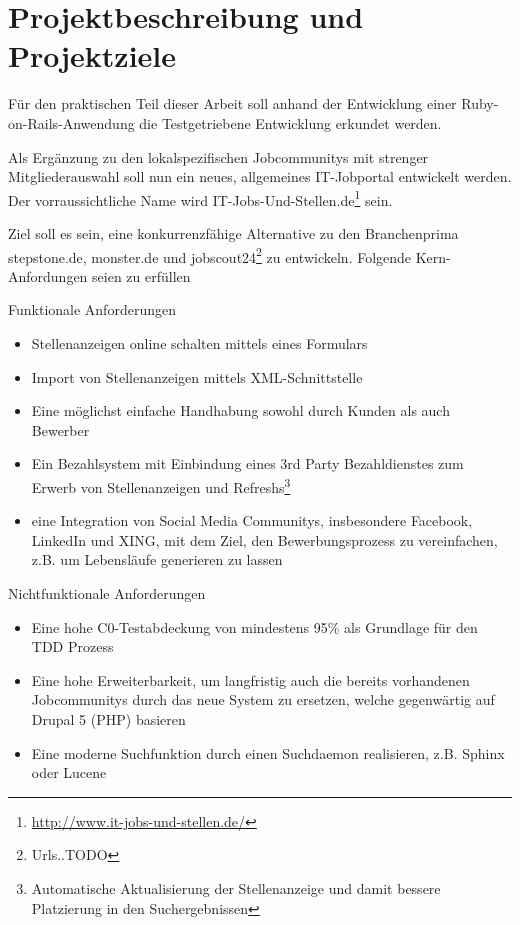 
\section{Projektbeschreibung und Projektziele}
Für den praktischen Teil dieser Arbeit soll anhand der Entwicklung einer Ruby-on-Rails-Anwendung die Testgetriebene Entwicklung erkundet werden.

Als Ergänzung zu den lokalspezifischen Jobcommunitys mit strenger Mitgliederauswahl soll nun ein neues, allgemeines IT-Jobportal entwickelt werden. Der vorraussichtliche Name wird IT-Jobs-Und-Stellen.de\footnote{\url{http://www.it-jobs-und-stellen.de/}} sein.

Ziel soll es sein, eine konkurrenzfähige Alternative zu den Branchenprima stepstone.de, monster.de und jobscout24\footnote{Urls..TODO} zu entwickeln. Folgende Kern-Anfordungen seien zu erfüllen

Funktionale Anforderungen
\begin{itemize}
 \item Stellenanzeigen online schalten mittels eines Formulars
 \item Import von Stellenanzeigen mittels XML-Schnittstelle
 \item Eine möglichst einfache Handhabung sowohl durch Kunden als auch Bewerber
 \item Ein Bezahlsystem mit Einbindung eines 3rd Party Bezahldienstes zum Erwerb von Stellenanzeigen und Refreshs\footnote{Automatische Aktualisierung der Stellenanzeige und damit bessere Platzierung in den Suchergebnissen}
 \item eine Integration von Social Media Communitys, insbesondere Facebook, LinkedIn und XING, mit dem Ziel, den Bewerbungsprozess zu vereinfachen, z.B. um Lebensläufe generieren zu lassen
\end{itemize}

Nichtfunktionale Anforderungen
\begin{itemize}
 \item Eine hohe C0-Testabdeckung von mindestens 95\% als Grundlage für den TDD Prozess
 \item Eine hohe Erweiterbarkeit, um langfristig auch die bereits vorhandenen Jobcommunitys durch das neue System zu ersetzen, welche gegenwärtig auf Drupal 5 (PHP) basieren
 \item Eine moderne Suchfunktion durch einen Suchdaemon realisieren, z.B. Sphinx oder Lucene
\end{itemize}
